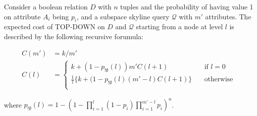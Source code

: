 \begin{theorem}\label{thm:expectedCostTopDown}
Consider a boolean relation $D$ with $n$ tuples and the probability of having value 1 on attribute $A_i$ being $p_i$, and a subspace skyline query $\mathcal{Q}$ with $m'$ attributes. The expected cost of TOP-DOWN on $D$ and $\mathcal{Q}$ starting from a node at level $l$ is described by the following recursive forumula:
\begin{small}
\begin{align}\label{eq:expectedCostTopDown}
\nonumber
C(m') &= k/m'\\
C(l) &= 
\begin{cases}
    k +  (1-p_{!\emptyset}(l)) m' C(l+1) & \quad \text{if } l = 0\\
    \frac{1}{l} \{ k + (1-p_{!\emptyset}(l) (m'-l) C(l+1) \} & \quad \text{otherwise}\\
\end{cases}
\end{align}
\end{small}
\hspace{-1mm}where $p_{!\emptyset}(l) = 1 - (1 - \prod_{i=1}^{l}(1-p_i)\prod_{i=1}^{m'-l}p_i ) ^ n$.
\end{theorem}

